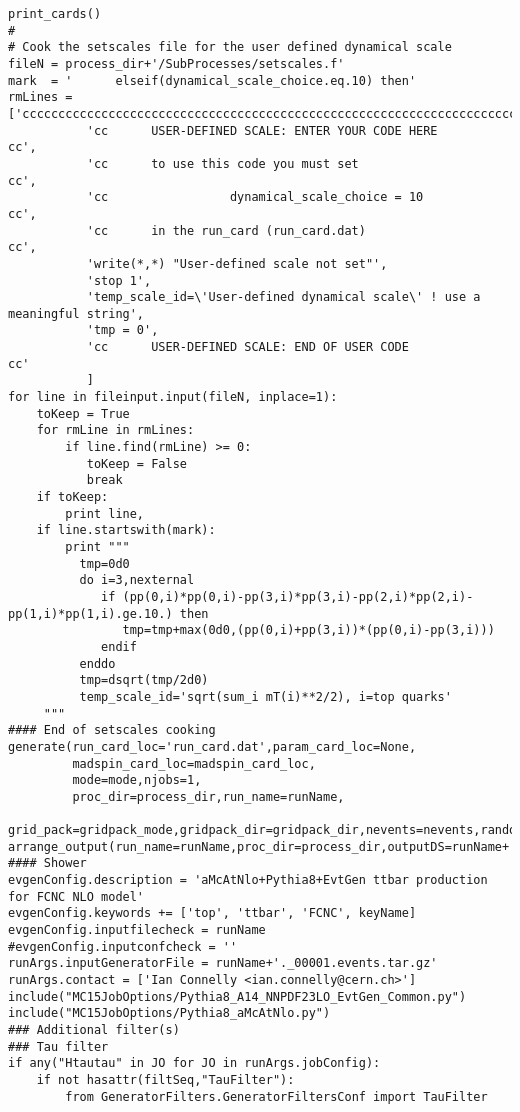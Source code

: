 \begin{tiny}
\begin{verbatim}
print_cards()
#
# Cook the setscales file for the user defined dynamical scale
fileN = process_dir+'/SubProcesses/setscales.f'
mark  = '      elseif(dynamical_scale_choice.eq.10) then'
rmLines = ['ccccccccccccccccccccccccccccccccccccccccccccccccccccccccccccccccccccccccccccccccccc',
           'cc      USER-DEFINED SCALE: ENTER YOUR CODE HERE                                 cc',
           'cc      to use this code you must set                                            cc',
           'cc                 dynamical_scale_choice = 10                                    cc',
           'cc      in the run_card (run_card.dat)                                           cc',
           'write(*,*) "User-defined scale not set"',
           'stop 1',
           'temp_scale_id=\'User-defined dynamical scale\' ! use a meaningful string',
           'tmp = 0',
           'cc      USER-DEFINED SCALE: END OF USER CODE                                     cc'
           ]
for line in fileinput.input(fileN, inplace=1):
    toKeep = True
    for rmLine in rmLines:
        if line.find(rmLine) >= 0:
           toKeep = False
           break
    if toKeep:
        print line,
    if line.startswith(mark):
        print """
          tmp=0d0
          do i=3,nexternal
             if (pp(0,i)*pp(0,i)-pp(3,i)*pp(3,i)-pp(2,i)*pp(2,i)-pp(1,i)*pp(1,i).ge.10.) then
                tmp=tmp+max(0d0,(pp(0,i)+pp(3,i))*(pp(0,i)-pp(3,i)))
             endif
          enddo
          tmp=dsqrt(tmp/2d0)
          temp_scale_id='sqrt(sum_i mT(i)**2/2), i=top quarks'
     """
#### End of setscales cooking
generate(run_card_loc='run_card.dat',param_card_loc=None,
         madspin_card_loc=madspin_card_loc,
         mode=mode,njobs=1,
         proc_dir=process_dir,run_name=runName,
         grid_pack=gridpack_mode,gridpack_dir=gridpack_dir,nevents=nevents,random_seed=runArgs.randomSeed)
arrange_output(run_name=runName,proc_dir=process_dir,outputDS=runName+'._00001.events.tar.gz',lhe_version=lhe_version)
#### Shower
evgenConfig.description = 'aMcAtNlo+Pythia8+EvtGen ttbar production for FCNC NLO model'
evgenConfig.keywords += ['top', 'ttbar', 'FCNC', keyName]
evgenConfig.inputfilecheck = runName
#evgenConfig.inputconfcheck = ''
runArgs.inputGeneratorFile = runName+'._00001.events.tar.gz'
runArgs.contact = ['Ian Connelly <ian.connelly@cern.ch>']
include("MC15JobOptions/Pythia8_A14_NNPDF23LO_EvtGen_Common.py")
include("MC15JobOptions/Pythia8_aMcAtNlo.py")
### Additional filter(s)
### Tau filter
if any("Htautau" in JO for JO in runArgs.jobConfig):
    if not hasattr(filtSeq,"TauFilter"):
        from GeneratorFilters.GeneratorFiltersConf import TauFilter

\end{verbatim}
\end{tiny}
